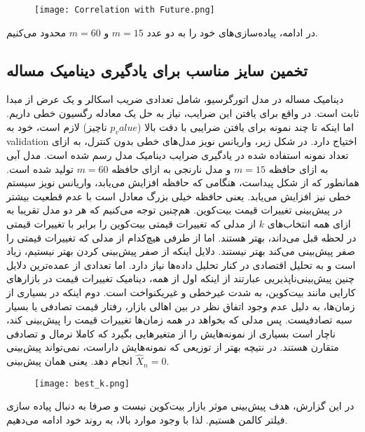 \documentclass{scribe-cgenomics}
\begin{document}
\begin{figure}[h]
\texttt{[image: Correlation with Future.png]}
\centering
\end{figure}

در ادامه، پیاده‌سازی‌های خود را به دو عدد
$m=15$
و
$m=60$
محدود می‌کنیم.





\subsection{تخمین سایز مناسب برای یادگیری دینامیک مساله}
دینامیک مساله در مدل اتورگرسیو، شامل تعدادی ضریب اسکالر و یک عرض از مبدا ثابت است. در واقع برای یافتن این ضرایب، نیاز به حل یک معادله رگسیون خطی داریم. اما اینکه تا چند نمونه برای یافتن ضرایبی با دقت بالا ($p_value$ ناچیز) لازم است، خود به
validation
اختیاج دارد. در شکل زیر، واریانس نویز مدل‌های خطی بدون کنترل، به ازای تعداد نمونه استفاده شده در یادگیری ضرایب دینامیک مدل رسم شده است. مدل آبی به ازای حافظه
$m=15$
و مدل نارنجی به ازای حافظه
$m=60$
تولید شده است. همانطور که از شکل پیداست، هنگامی که حافظه افزایش می‌یابد، واریانس نویز سیستم خطی نیز افزایش می‌یابد. یعنی حافظه خیلی بزرگ معادل است با عدم قطعیت بیشتر در پیش‌بینی تغییرات قیمت بیت‌کوین. هم‌چنین توجه می‌کنیم که هر دو مدل تقریبا به ازای همه انتخاب‌های
$k$
از مدلی که تغییرات قیمتی بیت‌کوین را برابر با تغییرات قیمتی در لحظه قبل می‌داند، بهتر هستند. اما از طرفی هیچ‌کدام از مدلی که تغییرات قیمتی را صفر پیش‌بینی می‌کند بهتر نیستند. دلایل اینکه از صفر پیش‌بینی کردن بهتر نیستیم، زیاد است و به تحلیل اقتصادی در کنار تحلیل داده‌ها نیاز دارد. اما تعدادی از عمده‌ترین دلایل چنین پیش‌بینی‌ناپذیریی عبارتند از اینکه اول از همه، دینامیک تغییرات قیمت در بازارهای کارایی مانند بیت‌کوین، به شدت غیرخطی و غیریکنواخت است. دوم اینکه در بسیاری از زمان‌ها، به دلیل عدم وجود اتفاق نظر در بین اهالی بازار، رفتار قیمت تصادفی یا بسیار سبه تصادفیست. پس مدلی که بخواهد در همه زمان‌ها تغییرات قیمت را پیش‌بینی کند، ناچار است بسیاری از نمونه‌هایش را از متغیرهایی بگیرد که کاملا نرمال و تصادفی متقارن هستند. در نتیچه بهتر از توزیعی که نمونه‌هایش داراست، نمی‌تواند پیش‌بینی انجام دهد. یعنی همان پیش‌بینی
$\hat{X}_n = 0$.

\begin{figure}[h]
\texttt{[image: best\_k.png]}
\centering
\end{figure}

در این گزارش، هدف پیش‌بینی موثر بازار بیت‌کوین نیست و صرفا به دنبال پیاده سازی فیلتر کالمن هستیم. لذا با وجود موارد بالا، به روند خود ادامه می‌دهیم.
\end{document}
